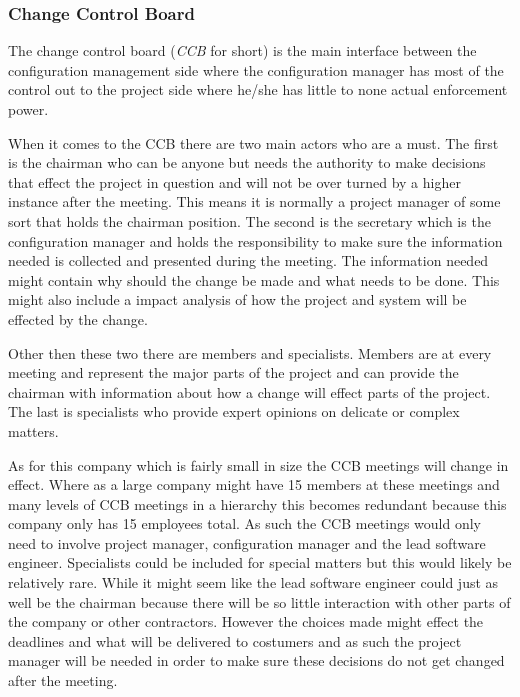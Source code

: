 \documentclass[a4paper]{article}
\begin{document}
\subsubsection{Change Control Board}\label{CCB}
The change control board (\emph{CCB} for short) is the main interface between the configuration management side where the configuration manager has most of the control out to the project side where he/she has little to none actual enforcement power. 

When it comes to the CCB there are two main actors who are a must. The first is the chairman who can be anyone but needs the authority to make decisions that effect the project in question and will not be over turned by a higher instance after the meeting. This means it is normally a project manager of some sort that holds the chairman position. The second is the secretary which is the configuration manager and holds the responsibility to make sure the information needed is collected and presented during the meeting. The information needed might contain why should the change be made and what needs to be done. This might also include a impact analysis of how the project and system will be effected by the change.\cite{daniels}

Other then these two there are members and specialists. Members are at every meeting and represent the major parts of the project and can provide the chairman with information about how a change will effect parts of the project. The last is specialists who provide expert opinions on delicate or complex matters.

As for this company which is fairly small in size the CCB meetings will change in effect. Where as a large company might have 15 members at these meetings and many levels of CCB meetings in a hierarchy this becomes redundant because this company only has 15 employees total. As such the CCB meetings would only need to involve project manager, configuration manager and the lead software engineer. Specialists could be included for special matters but this would likely be relatively rare. While it might seem like the lead software engineer could just as well be the chairman because there will be so little interaction with other parts of the company or other contractors. However the choices made might effect the deadlines and what will be delivered to costumers and as such the project manager will be needed in order to make sure these decisions do not get changed after the meeting.
\end{document}
